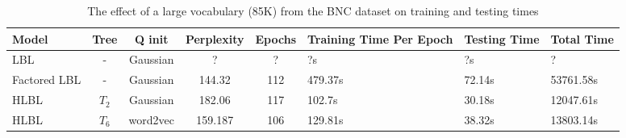 
\begin{table*} \centering
{}
\begin{tabular}{@{}C{2cm}ccccC{2cm}C{2cm}C{2cm}@{}}\toprule
Model & Tree & Q init & Perplexity & Epochs & Training Time Per Epoch & Testing Time & Total Time\\ 
\midrule
 LBL& - & Gaussian & ? &? &?s& ?s & ? \\
 Factored LBL & - & Gaussian &144.32& 112 & 479.37s & 72.14s & 53761.58s\\
 HLBL& $T_2$ & Gaussian &182.06& 117& 102.7s &30.18s &12047.61s \\
 HLBL & $T_6$ & word2vec &159.187& 106& 129.81s &38.32s &13803.14s \\
\bottomrule
\end{tabular}
\caption{The effect of a large vocabulary (85K) from the BNC dataset on training and testing times}
\label{tab:largeVocabulary}
\end{table*}
  
  
  
